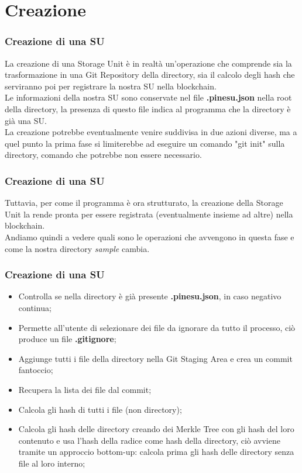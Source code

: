 \documentclass{beamer}
\begin{document}
\section{Creazione}
\begin{frame}
	\frametitle{Creazione di una SU}
	La creazione di una Storage Unit è in realtà un'operazione che comprende sia la trasformazione in una Git Repository della directory, sia il calcolo degli hash che serviranno poi per registrare la nostra SU nella blockchain.
	\\

	Le informazioni della nostra SU sono conservate nel file \textbf{.pinesu.json} nella root della directory, la presenza di questo file indica al programma che la directory è già una SU.
	\\

	La creazione potrebbe eventualmente venire suddivisa in due azioni diverse, ma a quel punto la prima fase si limiterebbe ad eseguire un comando "git init" sulla directory, comando che potrebbe non essere necessario.
\end{frame}
\begin{frame}
	\frametitle{Creazione di una SU}
	Tuttavia, per come il programma è ora strutturato, la creazione della Storage Unit la rende pronta per essere registrata (eventualmente insieme ad altre) nella blockchain.
	\\

	Andiamo quindi a vedere quali sono le operazioni che avvengono in questa fase e come la nostra directory \emph{sample} cambia.
\end{frame}
\begin{frame}
	\frametitle{Creazione di una SU}
	\begin{itemize}
		\item Controlla se nella directory è già presente \textbf{.pinesu.json}, in caso negativo continua;
		\item Permette all'utente di selezionare dei file da ignorare da tutto il processo, ciò produce un file \textbf{.gitignore};
		\item Aggiunge tutti i file della directory nella Git Staging Area e crea un commit fantoccio;
		\item Recupera la lista dei file dal commit;
		\item Calcola gli hash di tutti i file (non directory);
		\item Calcola gli hash delle directory creando dei Merkle Tree con gli hash del loro contenuto e usa l'hash della radice come hash della directory, ciò avviene tramite un approccio bottom-up: calcola prima gli hash delle directory senza file al loro interno;
	\end{itemize}
\end{frame}
\end{document}
